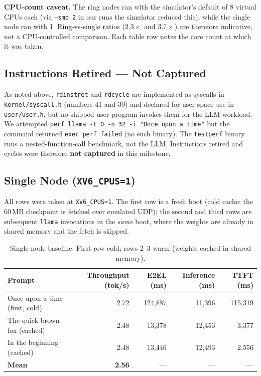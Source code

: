 \documentclass[11pt,a4paper]{article}
\begin{document}
\textbf{CPU-count caveat.} The ring nodes ran with the simulator's default of 8 virtual CPUs each (via \texttt{--smp 2} in our runs the simulator reduced this), while the single node ran with 1. Ring-vs-single ratios ($2.3\times$ and $3.7\times$) are therefore indicative, not a CPU-controlled comparison. Each table row notes the core count at which it was taken.

\subsection{Instructions Retired --- Not Captured}

As noted above, \texttt{rdinstret} and \texttt{rdcycle} are implemented as syscalls in \texttt{kernel/syscall.h} (numbers 41 and 39) and declared for user-space use in \texttt{user/user.h}, but no shipped user program invokes them for the LLM workload. We attempted \texttt{perf llama -t 0 -n 32 -i "Once upon a time"} but the command returned \texttt{exec perf failed} (no such binary). The \texttt{testperf} binary runs a nested-function-call benchmark, not the LLM. Instructions retired and cycles were therefore \textbf{not captured} in this milestone.

\subsection{Single Node (\texttt{XV6\_CPUS=1})}

All rows were taken at \texttt{XV6\_CPUS=1}. The first row is a fresh boot (cold cache: the 60\,MB checkpoint is fetched over emulated UDP); the second and third rows are subsequent \texttt{llama} invocations in the \emph{same} boot, where the weights are already in shared memory and the fetch is skipped.

\begin{table}[H]
\centering
\begin{tabular}{lrrrr}
\toprule
\textbf{Prompt} & \textbf{Throughput (tok/s)} & \textbf{E2EL (ms)} & \textbf{Inference (ms)} & \textbf{TTFT (ms)} \\
\midrule
Once upon a time (first, cold) & 2.72 & 124,887 & 11,396 & 115,319 \\
The quick brown fox (cached)  & 2.48 & 13,378  & 12,453 & 3,377 \\
In the beginning (cached)     & 2.48 & 13,446  & 12,493 & 2,556 \\
\midrule
\textbf{Mean}                 & \textbf{2.56} & --- & --- & --- \\
\bottomrule
\end{tabular}
\caption{Single-node baseline. First row cold; rows 2--3 warm (weights cached in shared memory).}
\end{table}
\end{document}
